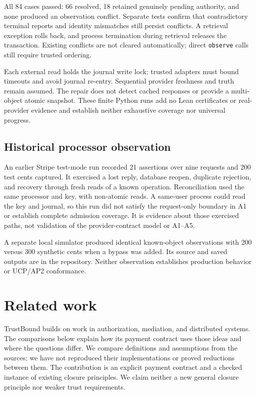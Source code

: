 \documentclass[11pt]{article}
\newcommand{\code}[1]{\texttt{\small #1}}
\begin{document}
All 84 cases passed: 66 resolved, 18 retained genuinely pending authority, and
none produced an observation conflict. Separate tests confirm that contradictory
terminal reports and identity mismatches still persist conflicts. A retrieval
exception rolls back, and process termination during retrieval releases the
transaction. Existing conflicts are not cleared automatically; direct
\code{observe} calls still require trusted ordering.

Each external read holds the journal write lock; trusted adapters must bound
timeouts and avoid journal re-entry. Sequential provider freshness and truth
remain assumed. The repair does not detect cached responses or provide a
multi-object atomic snapshot. These finite Python runs add no Lean certificates
or real-provider evidence and establish neither exhaustive coverage nor
universal progress.

\subsection{Historical processor observation}
\label{sec:historical}
An earlier Stripe test-mode run recorded 21 assertions over nine requests and
200 test cents captured. It exercised a lost reply, database reopen, duplicate
rejection, and recovery through fresh reads of a known operation. Reconciliation
used the same processor and key, with non-atomic reads. A same-user process
could read the key and journal, so this run did not satisfy the request-only
boundary in A1 or establish complete admission coverage. It is evidence about
those exercised paths, not validation of the provider-contract model or A1--A5.

A separate local simulator produced identical known-object observations with
200 versus 300 synthetic cents when a bypass was added. Its source and saved
outputs are in the repository. Neither observation establishes production
behavior or UCP/AP2 conformance.

\section{Related work}
\label{sec:related}
TrustBound builds on work in authorization, mediation, and distributed systems.
The comparisons below explain how its payment contract uses those ideas and
where the questions differ. We compare definitions and assumptions from the
sources; we have not reproduced their implementations or proved reductions
between them. The contribution is an explicit payment contract and a checked
instance of existing closure principles. We claim neither a new general closure
principle nor weaker trust requirements.
\end{document}

